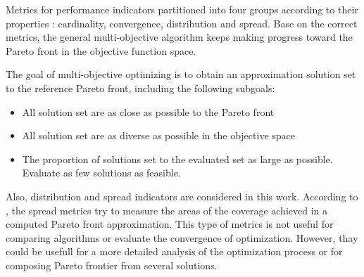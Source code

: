             Metrics for performance indicators partitioned into four groups according to their properties \cite{Audet2018PerformanceII}: cardinality, convergence, distribution and spread. Base on the correct metrics, the general multi-objective algorithm keeps making progress toward the Pareto front in the objective function space.

            The goal of multi-objective optimizing is to obtain an approximation solution set to the reference Pareto front, including the following subgoals:
            \begin{itemize}
                \item All solution set are as close as possible to the Pareto front
                \item All solution set are as diverse as possible in the objective space
                \item The proportion of solutions set to the evaluated set as large as possible. Evaluate as few solutions as feasible.
            \end{itemize}

            Also, distribution and spread indicators are considered in this work. According to \cite{CustodioMVV11}, the spread metrics try to measure the areas of the coverage achieved in a computed Pareto front approximation. This type of metrics is not useful for comparing algorithms or evaluate the convergence of optimization. However, thay could be usefull for a more detailed analysis of the optimization process or for composing Pareto frontier from several solutions.


